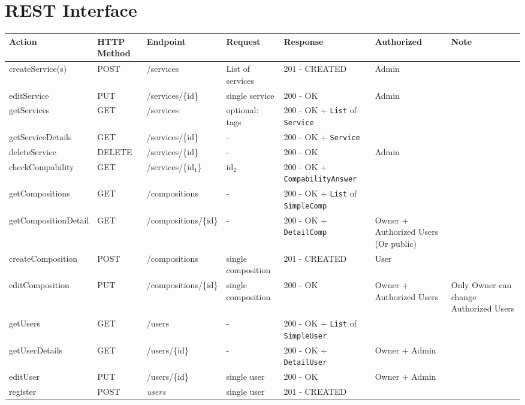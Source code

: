 \documentclass[11pt]{article}
\author{Christian Richter}
\date{\today}
\title{}
\begin{document}
\section{REST Interface}
\label{sec:org160f8fd}
\begin{center}
\begin{tabular}{lllllll}
Action & HTTP Method & Endpoint & Request & Response & Authorized & Note\\
\hline
createService(s) & POST & /services & List of services & 201 - CREATED & Admin & \\
editService & PUT & /services/\{id\} & single service & 200 - OK & Admin & \\
getServices & GET & /services & optional: tags & 200 - OK + \texttt{List} of \texttt{Service} &  & \\
getServiceDetails & GET & /services/\{id\} & - & 200 - OK + \texttt{Service} &  & \\
deleteService & DELETE & /services/\{id\} & - & 200 - OK & Admin & \\
\hline
checkCompability & GET & /services/\{id\(_{\text{1}}\)\} & id\(_{\text{2}}\) & 200 - OK + \texttt{CompabilityAnswer} &  & \\
\hline
getCompositions & GET & /compositions & - & 200 - OK + \texttt{List} of \texttt{SimpleComp} &  & \\
getCompositionDetail & GET & /compositions/\{id\} & - & 200 - OK + \texttt{DetailComp} & Owner + Authorized Users (Or public) & \\
createComposition & POST & /compositions & single composition & 201 - CREATED & User & \\
editComposition & PUT & /compositions/\{id\} & single composition & 200 - OK & Owner + Authorized Users & Only Owner can change Authorized Users\\
\hline
getUsers & GET & /users & - & 200 - OK + \texttt{List} of \texttt{SimpleUser} &  & \\
getUserDetails & GET & /users/\{id\} & - & 200 - OK + \texttt{DetailUser} & Owner + Admin & \\
editUser & PUT & /users/\{id\} & single user & 200 - OK & Owner + Admin & \\
register & POST & \emph{users} & single user & 201 - CREATED &  & \\
\hline
\end{tabular}
\end{center}
\end{document}
